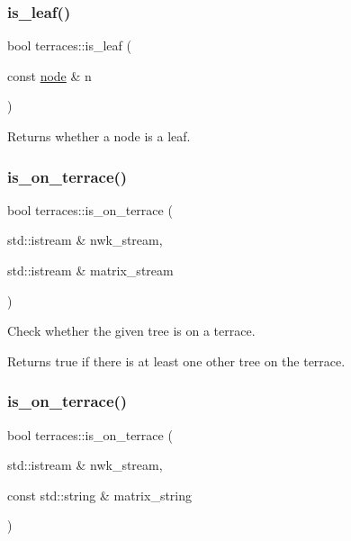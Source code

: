 \mbox{\label{namespaceterraces_a05257bc42db3c5cbed6ef082df709555}} 
\subsubsection{\texorpdfstring{is\+\_\+leaf()}{is\_leaf()}}
{\footnotesize\ttfamily bool terraces\+::is\+\_\+leaf (\begin{DoxyParamCaption}\item[{const \hyperlink{structterraces_1_1node}{node} \&}]{n }\end{DoxyParamCaption})\hspace{0.3cm}{\ttfamily [inline]}}

Returns whether a node is a leaf. \mbox{\label{namespaceterraces_a924744ce1ce711e40d0cf722d551e375}} 
\subsubsection{\texorpdfstring{is\+\_\+on\+\_\+terrace()}{is\_on\_terrace()}\hspace{0.1cm}{\footnotesize\ttfamily [1/4]}}
{\footnotesize\ttfamily bool terraces\+::is\+\_\+on\+\_\+terrace (\begin{DoxyParamCaption}\item[{std\+::istream \&}]{nwk\+\_\+stream,  }\item[{std\+::istream \&}]{matrix\+\_\+stream }\end{DoxyParamCaption})}

Check whether the given tree is on a terrace. \begin{DoxyReturn}{Returns}
true if there is at least one other tree on the terrace. 
\end{DoxyReturn}
\mbox{\label{namespaceterraces_a4e75afae24e5c7fef4f9b22ea3ee9486}} 
\subsubsection{\texorpdfstring{is\+\_\+on\+\_\+terrace()}{is\_on\_terrace()}\hspace{0.1cm}{\footnotesize\ttfamily [2/4]}}
{\footnotesize\ttfamily bool terraces\+::is\+\_\+on\+\_\+terrace (\begin{DoxyParamCaption}\item[{std\+::istream \&}]{nwk\+\_\+stream,  }\item[{const std\+::string \&}]{matrix\+\_\+string }\end{DoxyParamCaption})}

